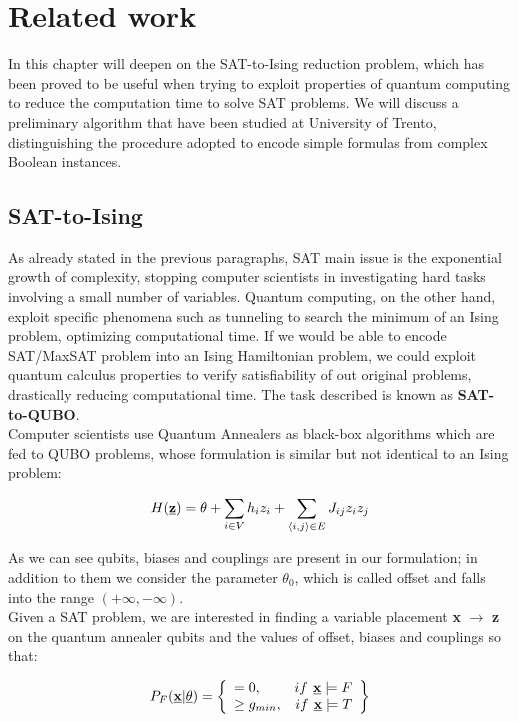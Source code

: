 \chapter{Related work}
\label{cha:related}

In this chapter will deepen on the SAT-to-Ising reduction problem, which has been proved to be useful when trying to exploit properties of quantum computing to reduce the computation time to solve SAT problems. We will discuss a preliminary algorithm that have been studied at University of Trento, distinguishing the procedure adopted to encode simple formulas from complex Boolean instances.

\section{SAT-to-Ising}
\label{sec:SATtoQUBO}

As already stated in the previous paragraphs, SAT main issue is the exponential growth of complexity, stopping computer scientists in investigating hard tasks involving a small number of variables. Quantum computing, on the other hand, exploit specific phenomena such as tunneling to search the minimum of an Ising problem, optimizing computational time. If we would be able to encode SAT/MaxSAT problem into an Ising Hamiltonian problem, we could exploit quantum calculus properties to verify satisfiability of out original problems, drastically reducing computational time. The task described is known as \textbf{SAT-to-QUBO}. \\
Computer scientists use Quantum Annealers as black-box algorithms which are fed to QUBO problems, whose formulation is similar but not identical to an Ising problem:

\begin{equation}
    H(\textbf{\underline{z}}) =\theta + \sum_{i \in V} h_iz_i + \sum_{\langle i,j\rangle \in E} J_{ij} z_iz_j
\end{equation}

As we can see qubits, biases and couplings are present in our formulation; in addition to them we consider the parameter $\theta_0$, which is called offset and falls into the range $(+\infty, -\infty)$. \\
Given a SAT problem, we are interested in finding a variable placement \textbf{x} $\rightarrow$ \textbf{z} on the quantum annealer qubits and the values of offset, biases and couplings so that:

\begin{equation}
    P_F(\underline{\textbf{x}} | \underline{\theta}) = 
    \left\{
        \begin{array}{lr}
            = 0, & if \textbf{ \underline{x}} \models F \\
            \geq g_{min}, & if \textbf{ \underline{x}} \models T
        \end{array}
    \right\}
\end{equation}

